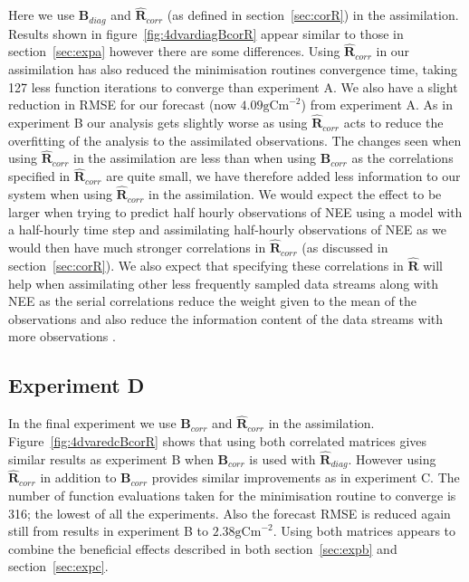 \documentclass[11pt]{article}
\begin{document}
Here we use $\textbf{B}_{diag}$ and $\hat{\textbf{R}}_{corr}$ (as defined in section~\ref{sec:corR}) in the assimilation. Results shown in figure~\ref{fig:4dvardiagBcorR} appear similar to those in section~\ref{sec:expa} however there are some differences. Using $\hat{\textbf{R}}_{corr}$ in our assimilation has also reduced the minimisation routines convergence time, taking 127 less function iterations to converge than experiment A. We also have a slight reduction in RMSE for our forecast (now $4.09 \text{gCm}^{-2}$) from experiment A. As in experiment B our analysis gets slightly worse as using $\hat{\textbf{R}}_{corr}$ acts to reduce the overfitting of the analysis to the assimilated observations. The changes seen when using $\hat{\textbf{R}}_{corr}$ in the assimilation are less than when using $\textbf{B}_{corr}$ as the correlations specified in $\hat{\textbf{R}}_{corr}$ are quite small, we have therefore added less information to our system when using $\hat{\textbf{R}}_{corr}$ in the assimilation. We would expect the effect to be larger when trying to predict half hourly observations of NEE using a model with a half-hourly time step and assimilating half-hourly observations of NEE as we would then have much stronger correlations in $\hat{\textbf{R}}_{corr}$ (as discussed in section~\ref{sec:corR}). We also expect that specifying these correlations in  $\hat{\textbf{R}}$ will help when assimilating other less frequently sampled data streams along with NEE as the serial correlations reduce the weight given to the mean of the observations and also reduce the information content of the data streams with more observations \citep{jarvinen1999variational, Daley1992}.

\subsection{Experiment D}

In the final experiment we use $\textbf{B}_{corr}$ and $\hat{\textbf{R}}_{corr}$ in the assimilation. Figure~\ref{fig:4dvaredcBcorR} shows that using both correlated matrices gives similar results as experiment B when $\textbf{B}_{corr}$ is used with $\hat{\textbf{R}}_{diag}$. However using $\hat{\textbf{R}}_{corr}$ in addition to $\textbf{B}_{corr}$ provides similar improvements as in experiment C. The number of function evaluations taken for the minimisation routine to converge is 316; the lowest of all the experiments. Also the forecast RMSE is reduced again still from results in experiment B to $2.38 \text{gCm}^{-2}$. Using both matrices appears to combine the beneficial effects described in both section~\ref{sec:expb} and section~\ref{sec:expc}.
 
\end{document}
